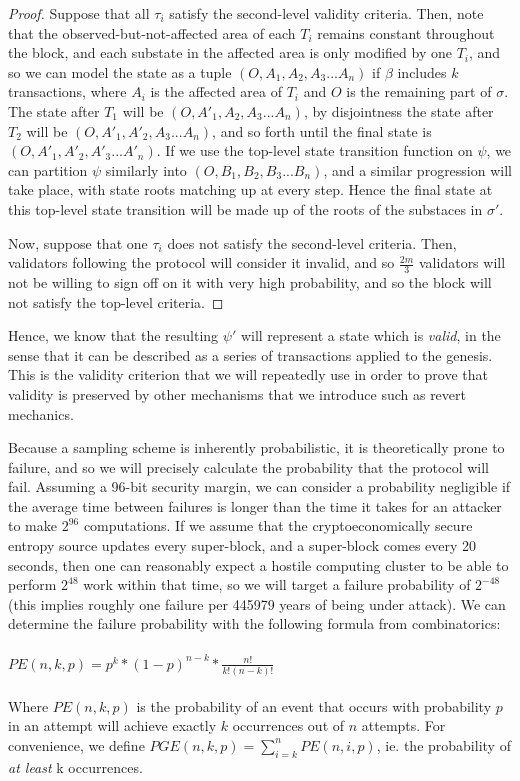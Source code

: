 \documentclass[11pt,a4paper]{report}
\theoremstyle{plain}
\theoremstyle{definition}
\theoremstyle{remark}
\begin{document}
\begin{proof}
Suppose that all $\tau_i$ satisfy the second-level validity criteria. Then, note that the observed-but-not-affected area of each $T_i$ remains constant throughout the block, and each substate in the affected area is only modified by one $T_i$, and so we can model the state as a tuple $(O, A_1, A_2, A_3 ... A_n)$ if $\beta$ includes $k$ transactions, where $A_i$ is the affected area of $T_i$ and $O$ is the remaining part of $\sigma$. The state after $T_1$ will be $(O, A'_1, A_2, A_3 ... A_n)$, by disjointness the state after $T_2$ will be $(O, A'_1, A'_2, A_3 ... A_n)$, and so forth until the final state is $(O, A'_1, A'_2, A'_3 ... A'_n)$. If we use the top-level state transition function on $\psi$, we can partition $\psi$ similarly into $(O, B_1, B_2, B_3 ... B_n)$, and a similar progression will take place, with state roots matching up at every step. Hence the final state at this top-level state transition will be made up of the roots of the substaces in $\sigma'$.

Now, suppose that one $\tau_i$ does not satisfy the second-level criteria. Then, validators following the protocol will consider it invalid, and so $\frac{2m}{3}$ validators will not be willing to sign off on it with very high probability, and so the block will not satisfy the top-level criteria.
\end{proof}

Hence, we know that the resulting $\psi'$ will represent a state which is \emph{valid}, in the sense that it can be described as a series of transactions applied to the genesis. This is the validity criterion that we will repeatedly use in order to prove that validity is preserved by other mechanisms that we introduce such as revert mechanics.

Because a sampling scheme is inherently probabilistic, it is theoretically prone to failure, and so we will precisely calculate the probability that the protocol will fail. Assuming a 96-bit security margin, we can consider a probability negligible if the average time between failures is longer than the time it takes for an attacker to make $2^{96}$ computations. If we assume that the cryptoeconomically secure entropy source updates every super-block, and a super-block comes every 20 seconds, then one can reasonably expect a hostile computing cluster to be able to perform $2^{48}$ work within that time, so we will target a failure probability of $2^{-48}$ (this implies roughly one failure per 445979 years of being under attack). We can determine the failure probability with the following formula from combinatorics:
\\
\\
$PE(n, k, p) = p^k * (1-p)^{n-k} * \frac{n!}{k!(n-k)!}$
\\
\\
Where $PE(n, k, p)$ is the probability of an event that occurs with probability $p$ in an attempt will achieve exactly $k$ occurrences out of $n$ attempts. For convenience, we define $PGE(n, k, p) = \sum_{i=k}^n PE(n, i, p)$, ie. the probability of \emph{at least} k occurrences.
\end{document}
